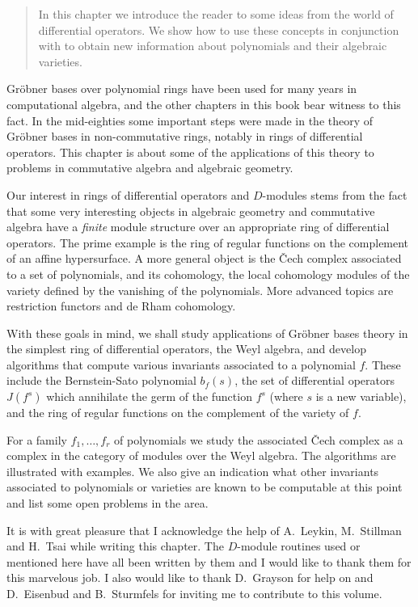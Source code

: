 % 

\begin{abstract}
  In this chapter we introduce the reader to some ideas from the world of
  differential operators. We show how to use these concepts in conjunction
  with \Mtwo to obtain new information about polynomials and their algebraic
  varieties.
\end{abstract}

Gr\"obner bases over polynomial rings have been used for many
years in computational algebra, and the other chapters in this book
bear witness to this fact. 
In the mid-eighties some important steps were made in the theory of
Gr\"obner bases in non-commutative rings, notably in rings of differential
operators. This chapter is about some of the applications of this
theory to problems in commutative algebra and algebraic geometry. 

Our interest in rings of differential operators and $D$-modules stems
from the fact that some very interesting objects in algebraic geometry and
commutative algebra have a {\em finite} module structure
over an appropriate ring of differential operators. The prime example
is the ring of regular functions on the complement of an affine
hypersurface. A more general object is the \v Cech complex associated
to a set of polynomials, and its cohomology, the local
cohomology modules of the variety defined by the vanishing of the
polynomials. More advanced topics are restriction functors and de Rham
cohomology. 

With these goals in mind, we shall study 
applications  of Gr\"obner bases theory 
in the simplest
ring of differential operators, the Weyl algebra, and develop
algorithms that compute various invariants associated to a polynomial
$f$. These include the Bernstein-Sato polynomial $b_f(s)$, the set of
differential  operators $J(f^s)$ 
which annihilate the germ of the function $f^s$
(where $s$ is a new variable), and the ring of regular functions on the
complement of the variety of $f$. 


For a family $f_1,\ldots,f_r$ of polynomials we study the associated \v Cech
complex as a complex in the category of modules over the Weyl
algebra. The algorithms are illustrated with examples.
We
also give an indication what other invariants associated to
polynomials or varieties are known to be computable at this point and
list some open problems in the area.


\begin{acknowledgment}
It is with great pleasure that I acknowledge the help of A.\ Leykin,
M.\ Stillman
and H.\ Tsai while writing this chapter. The $D$-module routines
used or mentioned here have all been written by them and I would like
to thank them for this marvelous job.
I also would like to thank D.\ Grayson for help on \Mtwo and D.\
Eisenbud and B.\ Sturmfels for inviting me to contribute to this volume.
\end{acknowledgment}

